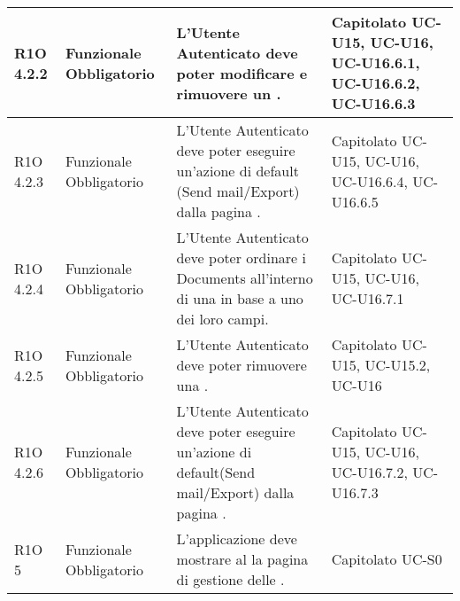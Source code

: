 \begin{center}
\begin{longtable}{ | l | p{2cm} | p{4.7cm} | p{2.5cm} |}
	R1O 4.2.2 & Funzionale \newline Obbligatorio & L’Utente Autenticato deve poter modificare e rimuovere un \glossaryItem{Document}. &  Capitolato \newline UC-U15, UC-U16, UC-U16.6.1, UC-U16.6.2, UC-U16.6.3  \newline  \\ \hline
	
	R1O 4.2.3 & Funzionale \newline Obbligatorio & L’Utente Autenticato deve poter eseguire un’azione di default (Send mail/Export) dalla pagina \glossaryItem{Document}.&  Capitolato \newline UC-U15, UC-U16, UC-U16.6.4, UC-U16.6.5  \newline  \\ \hline
	
	R1O 4.2.4 & Funzionale \newline Obbligatorio & L’Utente Autenticato deve poter ordinare i Documents all’interno di una \glossaryItem{Collection} in base a uno dei loro campi. &  Capitolato \newline UC-U15, UC-U16, UC-U16.7.1  \newline  \\ \hline
	
	R1O 4.2.5 & Funzionale \newline Obbligatorio & L’Utente Autenticato deve poter rimuovere una \glossaryItem{Collection}. &  Capitolato \newline UC-U15, UC-U15.2, UC-U16  \newline  \\ \hline
	
	R1O 4.2.6 & Funzionale \newline Obbligatorio & L’Utente Autenticato deve poter eseguire un’azione di default(Send mail/Export) dalla pagina \glossaryItem{Collection}. &  Capitolato \newline UC-U15, UC-U16, UC-U16.7.2, UC-U16.7.3  \newline  \\ \hline
	
	R1O 5 & Funzionale \newline Obbligatorio & L'applicazione deve mostrare al \glossaryItem{Super-Admin} la pagina di gestione delle \glossaryItem{Company}. &  Capitolato \newline UC-S0  \newline  \\ \hline
	

\end{longtable}
\end{center}
